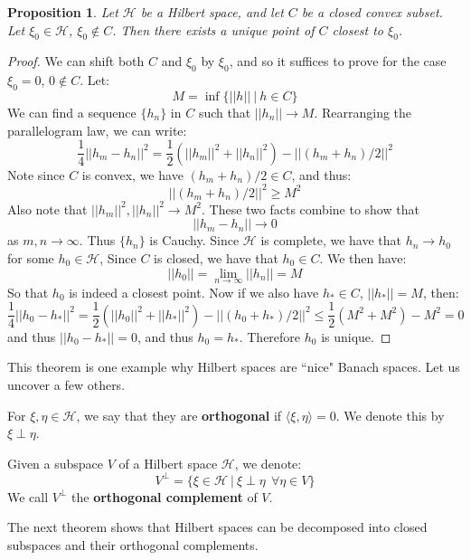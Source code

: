 \documentclass[a4paper,12pt]{report}
\newcommand{\ms}[1]{\mathscr{#1}}
\newtheorem{prop}[theorem]{Proposition}
\newenvironment{definition}[1][Definition.]{\begin{trivlist}
\item[\hskip \labelsep {\bfseries #1}]}{\end{trivlist}}
\begin{document}
	\begin{prop}
	Let $\ms{H}$ be a Hilbert space, and let $C$ be a closed convex subset. Let $\xi_0 \in \ms{H}$, $\xi_0 \notin C$. Then there exists a unique point of $C$ closest to $\xi_0$.
	\end{prop}
	\begin{proof}
	We can shift both $C$ and $\xi_0$ by $\xi_0$, and so it suffices to prove for the case $\xi_0 = 0$, $0 \notin C$. Let:
	\[ M = \inf \{ ||h|| ~|~ h \in C \} \]
	We can find a sequence $\{h_n\}$ in $C$ such that $||h_n|| \rightarrow M$. Rearranging the parallelogram law, we can write:
	\[ \frac{1}{4} ||h_m - h_n||^2 = \frac{1}{2}(||h_m||^2 + ||h_n||^2) - ||(h_m + h_n)/2||^2 \]
	Note since $C$ is convex, we have $(h_m + h_n)/2 \in C$, and thus:
	\[ ||(h_m + h_n)/2||^2 \geq M^2 \]
	Also note that $||h_m||^2, ||h_n||^2 \rightarrow M^2$. These two facts combine to show that 
	\[ ||h_m - h_n|| \rightarrow 0\]
	as $m, n \rightarrow \infty$. Thus $\{h_n\}$ is Cauchy. Since $\ms{H}$ is complete, we have that $h_n \rightarrow h_0$ for some $h_0 \in \ms{H}$, Since $C$ is closed, we have that $h_0 \in C$. We then have:
	\[ ||h_0|| = \lim_{n \rightarrow \infty} ||h_n|| = M \]
	So that $h_0$ is indeed a closest point. Now if we also have $h_* \in C$, $||h_*|| = M$, then:
	\[ \frac{1}{4} ||h_0 - h_*||^2 = \frac{1}{2}(||h_0||^2 + ||h_*||^2) - ||(h_0 + h_*)/2||^2 \leq \frac{1}{2}(M^2 + M^2) - M^2 = 0 \]
	and thus $||h_0 - h_*|| = 0$, and thus $h_0 = h_*$. Therefore $h_0$ is unique.
	\end{proof}

	\noindent This theorem is one example why Hilbert spaces are ``nice" Banach spaces. Let us uncover a few others.
	
	\begin{definition}
	For $\xi, \eta \in \ms{H}$, we say that they are \textbf{orthogonal} if $\langle \xi, \eta \rangle = 0$. We denote this by $\xi \perp \eta$. 
	\end{definition}	
	
	\begin{definition}
	Given a subspace $V$ of a Hilbert space $\ms{H}$, we denote:
	\[ V^\perp = \big\{ \xi \in \ms{H} ~|~ \xi \perp \eta ~~ \forall \eta \in V \big\} \]
	We call $V^\perp$ the \textbf{orthogonal complement} of $V$.
	\end{definition}
	
	\noindent The next theorem shows that Hilbert spaces can be decomposed into closed subspaces and their orthogonal complements.	
	
\end{document}
